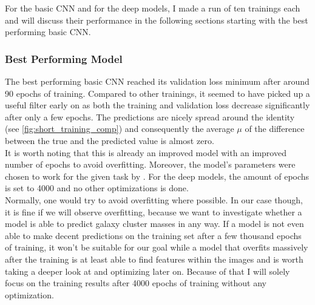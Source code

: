 For the basic CNN and for the deep models, I made a run of ten trainings each and will discuss their performance in the following sections starting with the best performing basic CNN.

\subsubsection*{Best Performing Model}

The best performing basic CNN reached its validation loss minimum after around 90 epochs of training. Compared to other trainings, it seemed to have picked up a useful filter early on as both the training and validation loss decrease significantly after only a few epochs. The predictions are nicely spread around the identity (see \autoref{fig:short_training_comp}) and consequently the average $\mu$ of the difference between the true and the predicted value is almost zero.\\
It is worth noting that this is already an improved model with an improved number of epochs to avoid overfitting. Moreover, the model's parameters were chosen to work for the given task by \citet{Krippendorf_2023}. For the deep models, the amount of epochs is set to 4000 and no other optimizations is done. \\

Normally, one would try to avoid overfitting where possible. In our case though, it is fine if we will observe overfitting, because we want to investigate whether a model is able to predict galaxy cluster masses in any way. If a model is not even able to make decent predictions on the training set after a few thousand epochs of training, it won't be suitable for our goal while a model that overfits massively after the training is at least able to find features within the images and is worth taking a deeper look at and optimizing later on. Because of that I will solely focus on the training results after 4000 epochs of training without any optimization.
